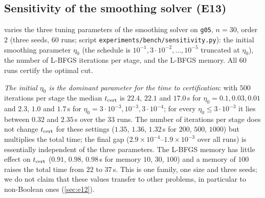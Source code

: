\documentclass[a4paper,11pt]{article}
\theoremstyle{plain}
\theoremstyle{definition}
\theoremstyle{remark}
\begin{document}
\subsection{Sensitivity of the smoothing solver (E13)}\label{sec:e13}
 varies the three tuning parameters of the smoothing solver on \texttt{g05}, $n=30$, order $2$ (three seeds, $60$ runs; script \texttt{experiments/bench/sensitivity.py}): the initial smoothing parameter $\eta_0$ (the schedule is $10^{-1},3\cdot10^{-2},\dots,10^{-5}$ truncated at $\eta_0$), the number of L-BFGS iterations per stage, and the L-BFGS memory. All $60$ runs certify the optimal cut.
\begin{table}[t]\centering\scriptsize
\setlength{\tabcolsep}{3pt}

\caption{Sensitivity on \texttt{g05}, $n=30$ (median over three seeds). ``certified'': runs with $\lfloor U\rfloor=$ best cut; ``final gap'': $U-$ best cut after the whole schedule; the last row pair varies the L-BFGS memory at $\eta_0=10^{-3}$, $500$ iterations.}\label{tab:sens}
\end{table}
\emph{The initial $\eta_0$ is the dominant parameter for the time to certification}: with $500$ iterations per stage the median $t_{\rm cert}$ is $22.4$, $22.1$ and $17.0$\,s for $\eta_0=0.1,0.03,0.01$ and $2.3$, $1.0$ and $1.7$\,s for $\eta_0=3\cdot10^{-3},10^{-3},3\cdot10^{-4}$; for every $\eta_0\le3\cdot10^{-3}$ it lies between $0.32$ and $2.35$\,s over the $33$ runs. The number of iterations per stage does not change $t_{\rm cert}$ for these settings ($1.35$, $1.36$, $1.32$\,s for $200$, $500$, $1000$) but multiplies the total time; the final gap ($2.9\times10^{-4}$--$1.9\times10^{-3}$ over all runs) is essentially independent of the three parameters. The L-BFGS memory has little effect on $t_{\rm cert}$ ($0.91$, $0.98$, $0.98$\,s for memory $10$, $30$, $100$) and a memory of $100$ raises the total time from $22$ to $37$\,s. This is one family, one size and three seeds; we do not claim that these values transfer to other problems, in particular to non-Boolean ones (\cref{sec:e12}).
\end{document}
